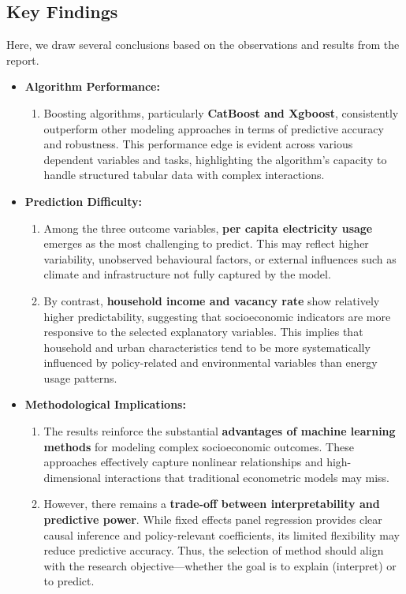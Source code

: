 \documentclass{article}
\begin{document}
\subsection{Key Findings}
Here, we draw several conclusions based on the observations and results from the report.
\begin{itemize}
\item{\textbf{Algorithm Performance:}}
    \begin{enumerate}
    \item Boosting algorithms, particularly \textbf{CatBoost and Xgboost}, consistently outperform other modeling approaches in terms of predictive accuracy and robustness. This performance edge is evident across various dependent variables and tasks, highlighting the algorithm’s capacity to handle structured tabular data with complex interactions.
    \end{enumerate}

\item {\textbf{Prediction Difficulty:}}
    \begin{enumerate}
    \item Among the three outcome variables, \textbf{per capita electricity usage} emerges as the most challenging to predict. This may reflect higher variability, unobserved behavioural factors, or external influences such as climate and infrastructure not fully captured by the model.
    \item By contrast, \textbf{household income and vacancy rate} show relatively higher predictability, suggesting that socioeconomic indicators are more responsive to the selected explanatory variables. This implies that household and urban characteristics tend to be more systematically influenced by policy-related and environmental variables than energy usage patterns.
    \end{enumerate}

\item{\textbf{Methodological Implications:}}
    \begin{enumerate}
    \item The results reinforce the substantial \textbf{advantages of machine learning methods} for modeling complex socioeconomic outcomes. These approaches effectively capture nonlinear relationships and high-dimensional interactions that traditional econometric models may miss.
    \item However, there remains a \textbf{trade-off between interpretability and predictive power}. While fixed effects panel regression provides clear causal inference and policy-relevant coefficients, its limited flexibility may reduce predictive accuracy. Thus, the selection of method should align with the research objective—whether the goal is to explain (interpret) or to predict.
    \end{enumerate}

\end{itemize}
\end{document}
